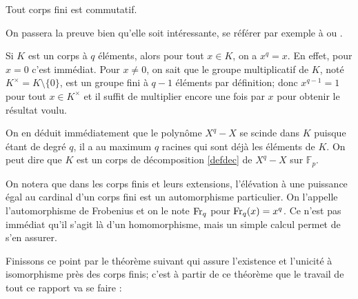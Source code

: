 \documentclass[a4paper]{article} %
\numberwithin{section}{part}
\numberwithin{equation}{section}
\newcommand\GF[1]{\mathbb{F}_{#1}}
\begin{document}
\begin{thm}[Wedderburn]
Tout corps fini est commutatif.
\end{thm}
On passera la preuve bien qu'elle soit intéressante, se référer par exemple à 
\cite[p.~70-73]{LiNi} ou \cite[p.~82]{Per}.\par
\vspace{0.3cm}
Si $K$ est un corps à $q$ éléments, alors pour tout $x\in K$, on a $x^q = x$. En
effet, pour $x = 0$ c'est immédiat. Pour $x\neq 0$, on sait que le groupe
multiplicatif de $K$, noté $K^{\times} = K\setminus\lbrace0\rbrace$, est un
groupe fini à $q-1$ éléments par définition; donc $x^{q-1} = 1$ pour tout $x\in
K^{\times}$ et il suffit de multiplier encore une fois par $x$ pour obtenir le
résultat voulu.\par
On en déduit immédiatement que le polynôme $X^q - X$ se scinde dans $K$
puisque étant de degré $q$, il a au maximum $q$ racines qui sont déjà les
éléments de $K$. On peut dire que $K$ est un corps de décomposition
\ref{defdec} de $X^q - X$ sur $\GF{p}$.\par
On notera que dans les corps finis et leurs extensions, l'élévation à une
puissance égal au cardinal d'un corps fini est un automorphisme particulier. On
l'appelle l'automorphisme de Frobenius et on le note $\textup{Fr}_q$ pour
$\textup{Fr}_q(x) = x^q$. Ce n'est pas immédiat qu'il s'agit là d'un 
homomorphisme, mais un simple calcul permet de s'en assurer.\par
\vspace{0.3cm}
Finissons ce point par le théorème suivant qui assure l'existence et l'unicité
à isomorphisme près des corps finis; c'est à partir de ce théorème que le
travail de tout ce rapport va se faire :
\end{document}
